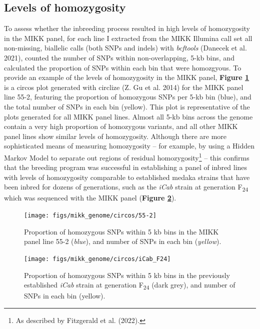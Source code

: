 \documentclass[
]{book}
\begin{document}
\hypertarget{levels-of-homozygosity}{%
\subsection{Levels of homozygosity}\label{levels-of-homozygosity}}

To assess whether the inbreeding process resulted in high levels of homozygosity in the MIKK panel, for each line I extracted from the MIKK Illumina call set all non-missing, biallelic calls (both SNPs and indels) with \emph{bcftools} (Danecek et al. 2021), counted the number of SNPs within non-overlapping, 5-kb bins, and calculated the proportion of SNPs within each bin that were homozgyous. To provide an example of the levels of homozygosity in the MIKK panel, \textbf{Figure \ref{fig:circos-55-2}} is a circos plot generated with circlize (Z. Gu et al. 2014) for the MIKK panel line 55-2, featuring the proportion of homozygous SNPs per 5-kb bin (blue), and the total number of SNPs in each bin (yellow). This plot is representative of the plots generated for all MIKK panel lines. Almost all 5-kb bins across the genome contain a very high proportion of homozygous variants, and all other MIKK panel lines show similar levels of homozygosity. Although there are more sophisticated means of measuring homozygosity -- for example, by using a Hidden Markov Model to separate out regions of residual homozygosity\footnote{As described by Fitzgerald et al. (2022).} -- this confirms that the breeding program was successful in establishing a panel of inbred lines with levels of homozygosity comparable to established medaka strains that have been inbred for dozens of generations, such as the \emph{iCab} strain at generation F\textsubscript{24} which was sequenced with the MIKK panel (\textbf{Figure \ref{fig:circos-iCab-F24}}).



\begin{figure}
\texttt{[image: figs/mikk\_genome/circos/55-2]} \caption{Proportion of homozygous SNPs within 5 kb bins in the MIKK panel line 55-2 (\emph{blue}), and number of SNPs in each bin (\emph{yellow}).}\label{fig:circos-55-2}
\end{figure}



\begin{figure}
\texttt{[image: figs/mikk\_genome/circos/iCab\_F24]} \caption{Proportion of homozygous SNPs within 5 kb bins in the previously established \emph{iCab} strain at generation F\textsubscript{24} (dark grey), and number of SNPs in each bin (yellow).}\label{fig:circos-iCab-F24}
\end{figure}
\end{document}

